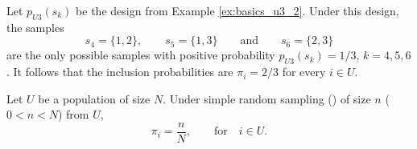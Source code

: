 \documentclass{my_eth_beamer}
\numberwithin{equation}{section}
\begin{document}
\begin{frame}
    \begin{Bsp}\label{ex:basics_u3_3}
        \vspace{-0.5em}
        Let $p_{U3}(s_k)$ be the design from Example
        \ref{ex:basics_u3_2}. Under this design, the samples
        \begin{equation*}
            s_4 = \{1, 2\}, \qquad s_5 = \{1, 3\} \qquad \text{and} \qquad
                s_6 = \{2, 3\}
        \end{equation*}
        \noindent are the only possible samples with positive probability
        $p_{U3}(s_k) = 1/3$, $k = 4, 5, 6$. It follows that the inclusion
        probabilities are $\pi_i = 2/3$ for every $i \in U$.
    \end{Bsp}
    \vspace{1em}
    \begin{Bsp}\label{ex:basics_es_3}
        \vspace{-0.5em}
        Let $U$ be a population of size $N$. Under \alert{simple random
        sampling} (\SRS) of size $n$ ($0 < n < N$) from $U$,
        \begin{equation*}
            \pi_i = \frac{n}{N}, \qquad \text{for} \quad i \in U.
        \end{equation*}
    \end{Bsp}
\end{frame}
\end{document}
